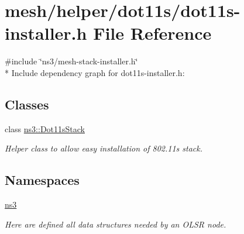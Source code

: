 \hypertarget{dot11s-installer_8h}{}\section{mesh/helper/dot11s/dot11s-\/installer.h File Reference}
\label{dot11s-installer_8h}
{\ttfamily \#include \char`\"{}ns3/mesh-\/stack-\/installer.\+h\char`\"{}}\\*
Include dependency graph for dot11s-\/installer.h\+:
\subsection*{Classes}
\begin{DoxyCompactItemize}
\item 
class \hyperlink{classns3_1_1Dot11sStack}{ns3\+::\+Dot11s\+Stack}
\begin{DoxyCompactList}\small\item\em Helper class to allow easy installation of 802.\+11s stack. \end{DoxyCompactList}\end{DoxyCompactItemize}
\subsection*{Namespaces}
\begin{DoxyCompactItemize}
\item 
 \hyperlink{namespacens3}{ns3}
\begin{DoxyCompactList}\small\item\em Here are defined all data structures needed by an O\+L\+SR node. \end{DoxyCompactList}\end{DoxyCompactItemize}
